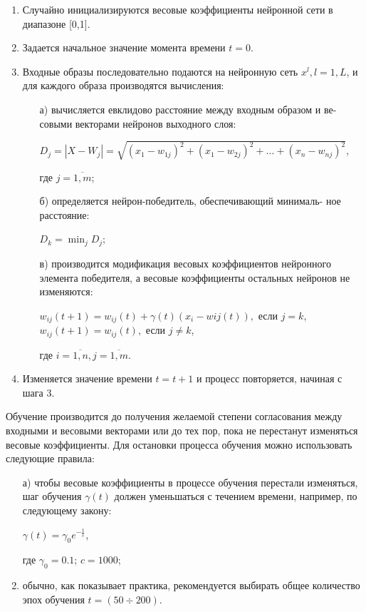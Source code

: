\documentclass[bachelor, och, referat]{template}
\begin{document}
\begin{enumerate}
    \item Случайно инициализируются весовые коэффициенты нейронной
    сети в диапазоне [0,1].
    \item Задается начальное значение момента времени $t = 0$.
    \item Входные образы последовательно подаются на нейронную сеть
    $x^l, l = 1, L$, и для каждого образа производятся вычисления:
    \begin{enumerate}
        \item[а)] вычисляется евклидово расстояние между входным образом и ве-
        совыми векторами нейронов выходного слоя:

        \begin{center}
            $D_j = |X - W_j| = \sqrt{(x_1 - w_{1j})^2 + (x_1 - w_{2j})^2 + \dots + (x_n - w_{nj})^2}$,
        \end{center}
        где $j = \overline{1, m}$;
        \item[б)] определяется нейрон-победитель, обеспечивающий минималь-
        ное расстояние:
        \begin{center}
            $D_k = \min_j D_j$;
        \end{center}
        \item[в)] производится модификация весовых коэффициентов нейронного
        элемента победителя, а весовые коэффициенты остальных нейронов не
        изменяются:

        \begin{center}
            $w_{ij}(t + 1) = w_{ij}(t) + \gamma(t)(x_i - w{ij}(t)), \text{ если } j = k$,
            $w_{ij}(t + 1) = w_{ij}(t), \text{ если } j \neq k$,
        \end{center}
        где $i = \overline{1, n}, j = \overline{1, m}$.
    \end{enumerate}
    \item Изменяется значение времени $t = t + 1$ и процесс повторяется, 
    начиная с шага 3.
\end{enumerate}

Обучение производится до получения желаемой степени согласования 
между входными и весовыми векторами или до тех пор, пока не
перестанут изменяться весовые коэффициенты. Для остановки процесса 
обучения можно использовать следующие правила:

\begin{enumerate}
    \item[а)] чтобы весовые коэффициенты в процессе обучения перестали
    изменяться, шаг обучения $\gamma(t)$ должен уменьшаться с течением времени, 
    например, по следующему закону:

    \begin{center}
        $\gamma(t) = \gamma_0 e^{-\frac{t}{c}}$,
    \end{center}
    где $\gamma_0 = 0.1$; $c = 1000$;
    \item обычно, как показывает практика, рекомендуется выбирать 
    общее количество эпох обучения $t = (50 \div 200)$.
\end{enumerate}
\end{document}
